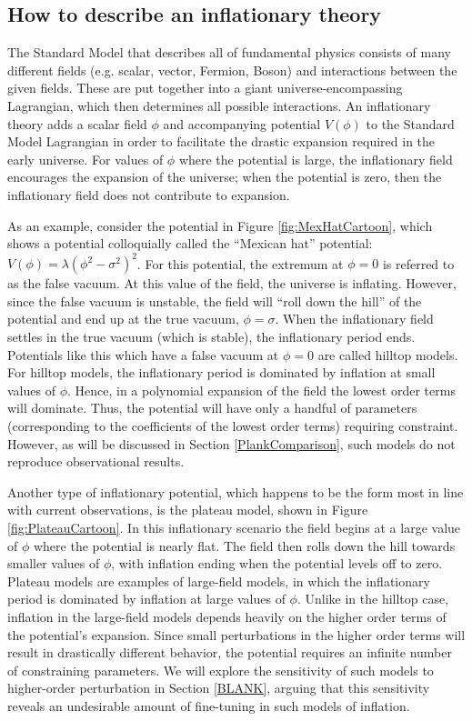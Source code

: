 \documentclass[onecolumn,apj]{emulateapj}
\begin{document}
\subsection{How to describe an inflationary theory}
\label{ssec:GeneralDescription}
The Standard Model that describes all of fundamental physics consists of many different fields (e.g. scalar, vector, Fermion, Boson) and interactions between the given fields. These are put together into a giant universe-encompassing Lagrangian, which then determines all possible interactions. An inflationary theory adds a scalar field $\phi$ and accompanying potential $V(\phi)$ to the Standard Model Lagrangian in order to facilitate the drastic expansion required in the early universe. For values of $\phi$ where the potential is large, the inflationary field encourages the expansion of the universe; when the potential is zero, then the inflationary field does not contribute to expansion. 

As an example, consider the potential in Figure \ref{fig:MexHatCartoon}, which shows a potential colloquially called the ``Mexican hat'' potential: $V(\phi)=\lambda(\phi^2-\sigma^2)^2$. For this potential, the extremum at $\phi=0$ is referred to as the false vacuum. At this value of the field, the universe is inflating. However, since the false vacuum is unstable, the field will ``roll down the hill'' of the potential and end up at the true vacuum, $\phi=\sigma$. When the inflationary field settles in the true vacuum (which is stable), the inflationary period ends. Potentials like this which have a false vacuum at $\phi=0$ are called hilltop models. For hilltop models, the inflationary period is dominated by inflation at small values of $\phi$. Hence, in a polynomial expansion of the field the lowest order terms will dominate. Thus, the potential will have only a handful of parameters (corresponding to the coefficients of the lowest order terms) requiring constraint. However, as will be discussed in Section \ref{PlankComparison}, such models do not reproduce observational results.

Another type of inflationary potential, which happens to be the form most in line with current observations, is the plateau model, shown in Figure \ref{fig:PlateauCartoon}. In this inflationary scenario the field begins at a large value of $\phi$ where the potential is nearly flat. The field then rolls down the hill towards smaller values of $\phi$, with inflation ending when the potential levels off to zero. Plateau models are examples of large-field models, in which the inflationary period is dominated by inflation at large values of $\phi$. Unlike in the hilltop case, inflation in the large-field models depends heavily on the higher order terms of the potential's expansion. Since small perturbations in the higher order terms will result in drastically different behavior, the potential requires an infinite number of constraining parameters. We will explore the sensitivity of such models to higher-order perturbation in Section \ref{BLANK}, arguing that this sensitivity reveals an undesirable amount of fine-tuning in such models of inflation.
\end{document}

